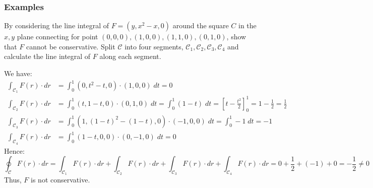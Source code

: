 \documentclass[a4paper, 10pt]{article}
\begin{document}
\subsubsection{Examples}
\begin{examplebox}{By considering the line integral of $F = (y, x^2 -x, 0)$ around the square $C$ in the $x,y$ plane connecting for point $(0, 0, 0), (1, 0, 0), (1, 1, 0), (0, 1, 0)$, show that $F$ cannot be conservative.}{}
  Split $\mathcal{C}$ into four segments, $\mathcal{C}_1, \mathcal{C}_2, \mathcal{C}_3, \mathcal{C}_4$ and calculate the line integral of $F$ along each segment.
  \begin{center}
  \end{center}
  We have:
  \begin{align*}
    \int_{\mathcal{C}_1} F(r) \cdot dr & = \int_{0}^{1} (0, t^2 - t, 0) \cdot (1, 0, 0) \; dt = 0                                                                                    \\
    \int_{\mathcal{C}_2} F(r) \cdot dr & = \int_{0}^{1} (t, 1 - t, 0) \cdot (0, 1, 0) \; dt = \int_{0}^{1} (1-t) \; dt = [t - \frac{t^2}{2}]_{0}^{1} = 1 - \frac{1}{2} = \frac{1}{2} \\
    \int_{\mathcal{C}_3} F(r) \cdot dr & = \int_{0}^{1} (1, (1-t)^2-(1-t), 0) \cdot (-1, 0, 0) \; dt = \int_{0}^{1} -1 \; dt = -1                                                    \\
    \int_{\mathcal{C}_4} F(r) \cdot dr & = \int_{0}^{1} (1-t, 0, 0) \cdot (0, -1, 0) \; dt = 0
  \end{align*}
  Hence:
  $$\oint_{\mathcal{C}} F(r) \cdot dr = \int_{\mathcal{C}_1} F(r) \cdot dr + \int_{\mathcal{C}_2} F(r) \cdot dr + \int_{\mathcal{C}_3} F(r) \cdot dr + \int_{\mathcal{C}_4} F(r) \cdot dr = 0 + \frac{1}{2} + (-1) + 0 = -\frac{1}{2} \neq 0$$
  Thus, $F$ is not conservative.
\end{examplebox}
\end{document}
